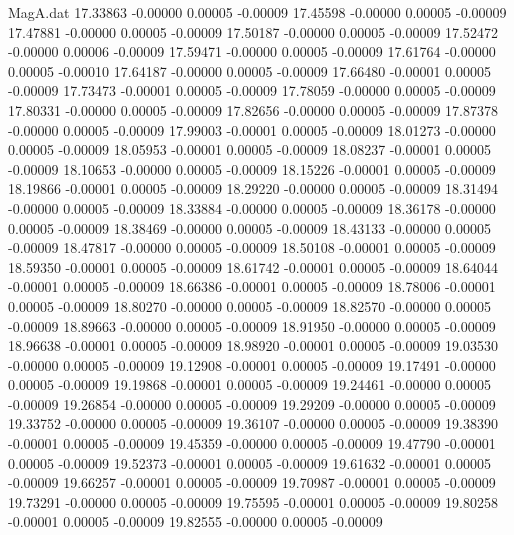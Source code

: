 \begin{filecontents}{MagA.dat}
  17.33863   -0.00000    0.00005   -0.00009
  17.45598   -0.00000    0.00005   -0.00009
  17.47881   -0.00000    0.00005   -0.00009
  17.50187   -0.00000    0.00005   -0.00009
  17.52472   -0.00000    0.00006   -0.00009
  17.59471   -0.00000    0.00005   -0.00009
  17.61764   -0.00000    0.00005   -0.00010
  17.64187   -0.00000    0.00005   -0.00009
  17.66480   -0.00001    0.00005   -0.00009
  17.73473   -0.00001    0.00005   -0.00009
  17.78059   -0.00000    0.00005   -0.00009
  17.80331   -0.00000    0.00005   -0.00009
  17.82656   -0.00000    0.00005   -0.00009
  17.87378   -0.00000    0.00005   -0.00009
  17.99003   -0.00001    0.00005   -0.00009
  18.01273   -0.00000    0.00005   -0.00009
  18.05953   -0.00001    0.00005   -0.00009
  18.08237   -0.00001    0.00005   -0.00009
  18.10653   -0.00000    0.00005   -0.00009
  18.15226   -0.00001    0.00005   -0.00009
  18.19866   -0.00001    0.00005   -0.00009
  18.29220   -0.00000    0.00005   -0.00009
  18.31494   -0.00000    0.00005   -0.00009
  18.33884   -0.00000    0.00005   -0.00009
  18.36178   -0.00000    0.00005   -0.00009
  18.38469   -0.00000    0.00005   -0.00009
  18.43133   -0.00000    0.00005   -0.00009
  18.47817   -0.00000    0.00005   -0.00009
  18.50108   -0.00001    0.00005   -0.00009
  18.59350   -0.00001    0.00005   -0.00009
  18.61742   -0.00001    0.00005   -0.00009
  18.64044   -0.00001    0.00005   -0.00009
  18.66386   -0.00001    0.00005   -0.00009
  18.78006   -0.00001    0.00005   -0.00009
  18.80270   -0.00000    0.00005   -0.00009
  18.82570   -0.00000    0.00005   -0.00009
  18.89663   -0.00000    0.00005   -0.00009
  18.91950   -0.00000    0.00005   -0.00009
  18.96638   -0.00001    0.00005   -0.00009
  18.98920   -0.00001    0.00005   -0.00009
  19.03530   -0.00000    0.00005   -0.00009
  19.12908   -0.00001    0.00005   -0.00009
  19.17491   -0.00000    0.00005   -0.00009
  19.19868   -0.00001    0.00005   -0.00009
  19.24461   -0.00000    0.00005   -0.00009
  19.26854   -0.00000    0.00005   -0.00009
  19.29209   -0.00000    0.00005   -0.00009
  19.33752   -0.00000    0.00005   -0.00009
  19.36107   -0.00000    0.00005   -0.00009
  19.38390   -0.00001    0.00005   -0.00009
  19.45359   -0.00000    0.00005   -0.00009
  19.47790   -0.00001    0.00005   -0.00009
  19.52373   -0.00001    0.00005   -0.00009
  19.61632   -0.00001    0.00005   -0.00009
  19.66257   -0.00001    0.00005   -0.00009
  19.70987   -0.00001    0.00005   -0.00009
  19.73291   -0.00000    0.00005   -0.00009
  19.75595   -0.00001    0.00005   -0.00009
  19.80258   -0.00001    0.00005   -0.00009
  19.82555   -0.00000    0.00005   -0.00009

\end{filecontents}
